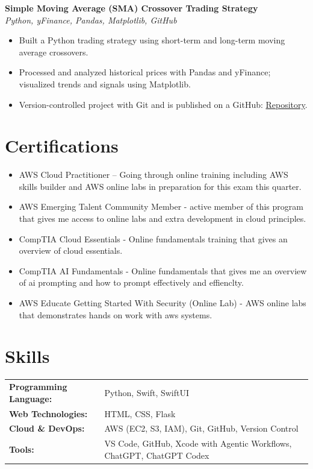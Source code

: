 \documentclass[9.5pt,a4paper]{article}
\begin{document}
\textbf{Simple Moving Average (SMA) Crossover Trading Strategy} \\
\textit{Python, yFinance, Pandas, Matplotlib, GitHub}
\begin{itemize}
    \item Built a Python trading strategy using short-term and long-term moving average crossovers.
    \item Processed and analyzed historical prices with Pandas and yFinance; visualized trends and signals using Matplotlib.
    \item Version-controlled project with Git and is published on a GitHub: \href{https://github.com/jackashleyb/Simple-Moving-Average-SMA-Crossover-Trading-Strategy}{Repository}.
\end{itemize}

\section*{Certifications}
\begin{itemize}
    \item AWS Cloud Practitioner – Going through online training including AWS skills builder and AWS online labs in preparation for this exam this quarter.
    \item AWS Emerging Talent Community Member - active member of this program that gives me access to online labs and extra development in cloud principles.
    \item CompTIA Cloud Essentials - Online fundamentals training that gives an overview of cloud essentials.
    \item CompTIA AI Fundamentals - Online fundamentals that gives me an overview of ai prompting and how to prompt effectively and effienclty.
    \item AWS Educate Getting Started With Security (Online Lab) - AWS online labs that demonstrates hands on work with aws systems.
\end{itemize}

\section*{Skills}
\begin{tabular}{@{}l l@{}}
\textbf{Programming Language:} & Python, Swift, SwiftUI \\
\textbf{Web Technologies:} & HTML, CSS, Flask \\
\textbf{Cloud \& DevOps:} & AWS (EC2, S3, IAM), Git, GitHub, Version Control \\
\textbf{Tools:} & VS Code, GitHub, Xcode with Agentic Workflows, ChatGPT, ChatGPT Codex \\
\end{tabular}
\end{document}
